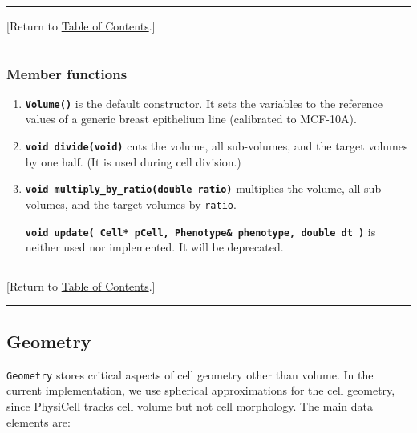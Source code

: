 \documentclass[12pt]{article}
\renewcommand{\v}{\verb}
\newcommand{\smallcode}[1]{\textbf{\texttt{#1}}}
\newcommand{\blue}[1]{\textcolor{blue}{#1}}
\newcommand{\DONE}{}%
\newcommand{\TOClink}{\begin{center}\hrule\vskip-10pt\phantom{.}\hfill[Return to \hyperlink{TOC}{Table of Contents}.]\hfill\phantom{.}\vskip3pt\hrule\end{center}}
\begin{document}
\TOClink

\subsubsection{Member functions}
\begin{enumerate}
\item 
\smallcode{Volume()} is the default constructor. It sets the variables to the reference values of 
a generic breast epithelium line (calibrated to MCF-10A).  

\item 
\smallcode{void divide(void)} cuts the volume, all sub-volumes, and the target volumes by one half. 
(It is used during cell division.) 

\item 
\smallcode{void multiply\_by\_ratio(double ratio)} multiplies the volume, all sub-volumes, and the target volumes by \v|ratio|. 

\smallcode{void update( Cell* pCell, Phenotype\& phenotype, double dt )} is 
neither used nor implemented. It will be deprecated. 
\end{enumerate}




\TOClink

\subsection{Geometry \DONE}
\label{sec:Geometry}
\v|Geometry| stores critical aspects of cell geometry other than volume. In the current 
implementation, we use spherical approximations for the cell geometry, since 
PhysiCell tracks cell volume but not cell morphology. The main data elements are: 
\end{document}

